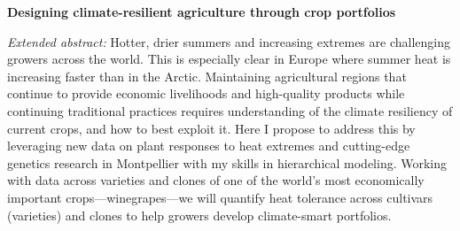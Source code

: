 \documentclass[11pt,letter,oneside]{article}
\begin{document}

\renewcommand{\refname}{\CHead{}}

\begin{centering}
{\bf Designing climate-resilient agriculture through crop portfolios}\\ %
\end{centering}
\vspace{2ex}


\emph{Extended abstract:} Hotter, drier summers and increasing extremes are challenging growers across the world. This is especially clear in Europe where summer heat is increasing faster than in the Arctic. Maintaining agricultural regions that continue to provide economic livelihoods and high-quality products while continuing traditional practices requires understanding of the climate resiliency of current crops, and how to best exploit it. Here I propose to address this by leveraging new data on plant responses to heat extremes and cutting-edge genetics research in Montpellier with my skills in hierarchical modeling. Working with data across varieties and clones of one of the world's most economically important crops---winegrapes---we will quantify heat tolerance across cultivars (varieties) and clones to help growers develop climate-smart portfolios. %


\end{document}
